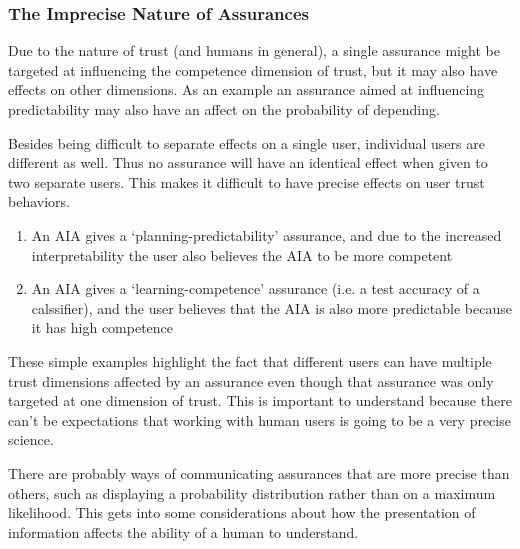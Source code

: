 




\subsubsection{The Imprecise Nature of Assurances}\label{sec:imprecise}
    Due to the nature of trust (and humans in general), a single assurance might be targeted at influencing the competence dimension of trust, but it may also have effects on other dimensions. As an example an assurance aimed at influencing predictability may also have an affect on the probability of depending.

    Besides being difficult to separate effects on a single user, individual users are different as well. Thus no assurance will have an identical effect when given to two separate users. This makes it difficult to have precise effects on user trust behaviors.

    \begin{enumerate}
        \item An AIA gives a `planning-predictability' assurance, and due to the increased interpretability the user also believes the AIA to be more competent
        \item An AIA gives a `learning-competence' assurance (i.e. a test accuracy of a calssifier), and the user believes that the AIA is also more predictable because it has high competence
    \end{enumerate}

    These simple examples highlight the fact that different users can have multiple trust dimensions affected by an assurance even though that assurance was only targeted at one dimension of trust. This is important to understand because there can't be expectations that working with human users is going to be a very precise science.

    There are probably ways of communicating assurances that are more precise than others, such as displaying a probability distribution rather than on a maximum likelihood. This gets into some considerations about how the presentation of information affects the ability of a human to understand.
